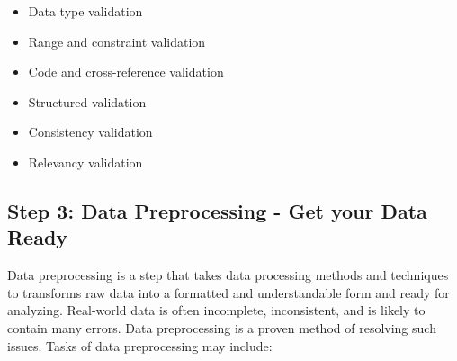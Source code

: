 \documentclass[
]{book}
\providecommand{\tightlist}{%
  \setlength{\itemsep}{0pt}\setlength{\parskip}{0pt}}
\begin{document}
\begin{itemize}
\tightlist
\item
  Data type validation
\item
  Range and constraint validation
\item
  Code and cross-reference validation
\item
  Structured validation
\item
  Consistency validation
\item
  Relevancy validation
\end{itemize}

\hypertarget{preprocess}{%
\subsection*{Step 3: Data Preprocessing - Get your Data Ready}\label{preprocess}}


Data preprocessing is a step that takes data processing methods and techniques to transforms raw data into a formatted and understandable form and ready for analyzing. Real-world data is often incomplete, inconsistent, and is likely to contain many errors. Data preprocessing is a proven method of resolving such issues. Tasks of data preprocessing may include:
\end{document}
